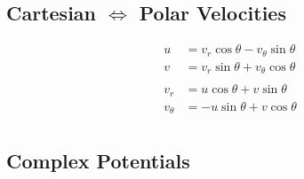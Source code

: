 \documentclass[11pt, letterpaper, notitlepage]{article}
\begin{document}
\subsection{Cartesian $\Leftrightarrow$ Polar Velocities}
\begin{align*}
u &= v_r \cos{\theta} - v_{\theta} \sin{\theta} \\
v &= v_r \sin{\theta} + v_{\theta} \cos{\theta} \\ \\
v_r &= u \cos{\theta} + v \sin{\theta} \\
v_{\theta} &= -u \sin{\theta} + v \cos{\theta} \\
\end{align*}

\subsection{Complex Potentials}
\end{document}
